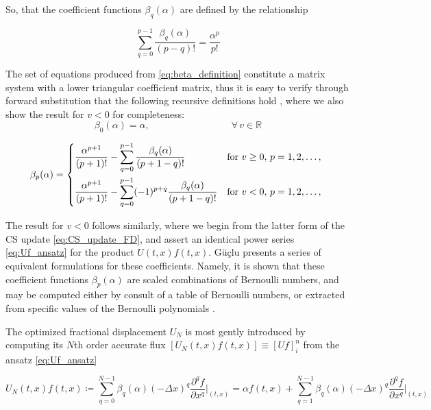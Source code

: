 \documentclass[11pt,titlepage]{report}
\begin{document}
\noindent So, that the coefficient functions $\beta_q(\alpha )$ are defined by the relationship

\begin{equation}
\sum_{q = 0}^{p-1}\frac{\beta_q(\alpha )}{(p - q)!} = \frac{\alpha^p}{p!} \label{eq:beta_definition}
\end{equation}

\noindent The set of equations produced from \eqref{eq:beta_definition} constitute a matrix system with a lower triangular coefficient matrix, thus it is easy to verify through forward substitution that the following recursive definitions hold \cite{Guclu14}, where we also show the result for $v < 0$ for completeness:\\[0.5em]

\begin{equation}\beta_0(\alpha )  =  \alpha ,\qquad \qquad \qquad \,\,\,\qquad \forall\, v\in\mathbb{R}\end{equation}

\begin{equation}
\label{eq:beta_q}
\beta_p(\alpha ) =
\begin{dcases*}
\frac{\alpha^{p+1}}{(p+1)!} - \sum_{q = 0}^{p - 1}\frac{\beta_q(\alpha )}{(p + 1 - q)!} &
for $v \geq 0, \, p = 1, 2, \ldots, $\\
\frac{\alpha^{p+1}}{(p+1)!} - \sum_{q = 0}^{p - 1}(-1)^{p+q}\frac{\beta_q(\alpha )}{(p + 1 - q)!} &
for $v < 0, \, p = 1, 2, \ldots, $
\end{dcases*}
\end{equation}

\noindent The result for $v < 0$ follows similarly, where we begin from the latter form of the CS update \eqref{eq:CS_update_FD}, and assert an identical power series \eqref{eq:Uf_ansatz} for the product $U(t,x)f(t,x)$. G\"{u}\c{c}lu presents a series of equivalent formulations for these coefficients. Namely, it is shown that these coefficient functions $\beta_p(\alpha )$ are scaled combinations of Bernoulli numbers, and may be computed either by consult of a table of Bernoulli numbers, or extracted from specific values of the Bernoulli polynomials \cite{Guclu14}.

The optimized fractional displacement $U_N$ is most gently introduced by computing its $N$th order accurate flux $[U_N(t,x)f(t,x)] \equiv [Uf]_i^n$ from the ansatz \eqref{eq:Uf_ansatz}

\begin{equation}\boxed{U_N(t,x)f(t,x) \coloneqq \sum_{q = 0}^{N-1} \beta_q(\alpha )(-\Delta x)^q\frac{\partial^q f}{\partial x^q}\biggr|_{(t,x)} = \alpha f(t,x) + \sum_{q = 1}^{N-1} \beta_q(\alpha )(-\Delta x)^q\frac{\partial^q f}{\partial x^q}\biggr|_{(t,x)}}\label{eq:Uf}\end{equation}
\end{document}
